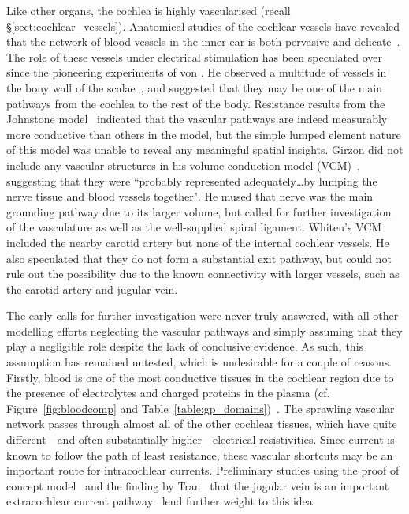 Like other organs, the cochlea is highly vascularised (recall
\S\ref{sect:cochlear_vessels}). Anatomical studies of the cochlear vessels have
revealed that the network of blood vessels in the inner ear is both pervasive
and delicate~\cite{smith1951,axelsson1968,nakashima2003,roland2006,wright2013}.
The role of these vessels under electrical stimulation has been speculated over
since the pioneering experiments of von \bekesy{}. He observed a multitude of
vessels in the bony wall of the scalae~\cite[p. 659]{vonbekesy1960}, and
suggested that they may be one of the main pathways from the cochlea to the rest
of the body. Resistance results from the Johnstone model~\cite{johnstone1966}
indicated that the vascular pathways are indeed measurably more conductive than
others in the model, but the simple lumped element nature of this model was
unable to reveal any meaningful spatial insights. Girzon did not include any
vascular structures in his volume conduction model (VCM)~\cite{girzon1987},
suggesting that they were ``probably represented adequately\ldots by lumping the
nerve tissue and blood vessels together". He mused that nerve was the main
grounding pathway due to its larger volume, but called for further investigation
of the vasculature as well as the well-supplied spiral ligament. Whiten's
VCM~\cite{whiten2007} included the nearby carotid artery but none of the
internal cochlear vessels. He also speculated that they do not form a
substantial exit pathway, but could not rule out the possibility due to the
known connectivity with larger vessels, such as the carotid artery and jugular
vein.


The early calls for further investigation were never truly answered, with all
other modelling efforts neglecting the vascular pathways and simply assuming
that they play a negligible role despite the lack of conclusive evidence. As
such, this assumption has remained untested, which is undesirable for a couple
of reasons. Firstly, blood is one of the most conductive tissues in the cochlear
region due to the presence of electrolytes and charged proteins in the plasma
(cf. Figure~\ref{fig:bloodcomp} and
Table~\ref{table:gp_domains})~\cite{gabriel1996b,grimnes2000}. The sprawling
vascular network passes through almost all of the other cochlear tissues, which
have quite different---and often substantially higher---electrical
resistivities. Since current is known to follow the path of least resistance,
these vascular shortcuts may be an important route for intracochlear currents.
Preliminary studies using the proof of concept model~\cite{wong2012} and the
finding by Tran~\etal{} that the jugular vein is an important extracochlear
current pathway~\cite{tran2011,tran2013embc} lend further weight to this idea.

